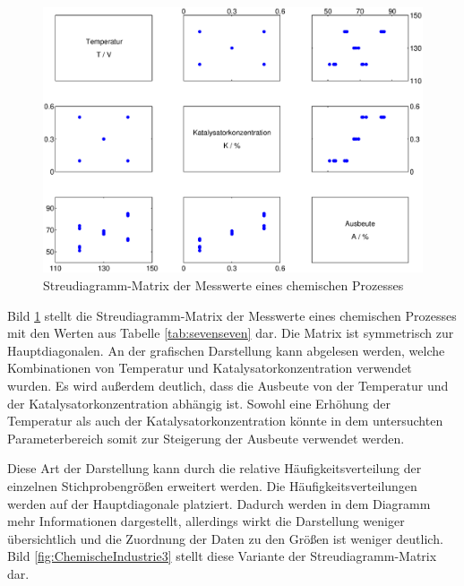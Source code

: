 \noindent 
\begin{figure}[H]
  \centerline{\includegraphics[width=1\textwidth]{Kapitel7/Bilder/image6}}
  \caption{Streudiagramm-Matrix der Messwerte eines chemischen Prozesses}
  \label{fig:ChemischeIndustrie2}
\end{figure}

\noindent Bild \ref{fig:ChemischeIndustrie2} stellt die Streudiagramm-Matrix der Messwerte eines chemischen Prozesses mit den Werten aus Tabelle \ref{tab:sevenseven} dar. Die Matrix ist symmetrisch zur Hauptdiagonalen. An der grafischen Darstellung kann abgelesen werden, welche Kombinationen von Temperatur und Katalysatorkonzentration verwendet wurden. Es wird au{\ss}erdem deutlich, dass die Ausbeute von der Temperatur und der Katalysatorkonzentration abh\"{a}ngig ist. Sowohl eine Erh\"{o}hung der Temperatur als auch der Katalysatorkonzentration k\"{o}nnte in dem untersuchten Parameterbereich somit zur Steigerung der Ausbeute verwendet werden.\newline

\noindent Diese Art der Darstellung kann durch die relative H\"{a}ufigkeitsverteilung der einzelnen Stichprobengr\"{o}{\ss}en erweitert werden. Die H\"{a}ufigkeitsverteilungen werden auf der Hauptdiagonale platziert. Dadurch werden in dem Diagramm mehr Informationen dargestellt, allerdings wirkt die Darstellung weniger \"{u}bersichtlich und die Zuordnung der Daten zu den Gr\"{o}{\ss}en ist weniger deutlich. Bild \ref{fig:ChemischeIndustrie3} stellt diese Variante der Streudiagramm-Matrix dar.

